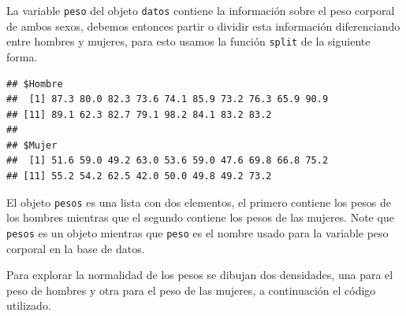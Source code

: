 \documentclass[10pt,]{krantz}
\makeatletter
\newenvironment{Shaded}{\begin{snugshade}}{\end{snugshade}}
\newcommand{\KeywordTok}[1]{\textcolor[rgb]{0.13,0.29,0.53}{\textbf{#1}}}
\newcommand{\DataTypeTok}[1]{\textcolor[rgb]{0.13,0.29,0.53}{#1}}
\newcommand{\DecValTok}[1]{\textcolor[rgb]{0.00,0.00,0.81}{#1}}
\newcommand{\StringTok}[1]{\textcolor[rgb]{0.31,0.60,0.02}{#1}}
\newcommand{\CommentTok}[1]{\textcolor[rgb]{0.56,0.35,0.01}{\textit{#1}}}
\newcommand{\OperatorTok}[1]{\textcolor[rgb]{0.81,0.36,0.00}{\textbf{#1}}}
\newcommand{\NormalTok}[1]{#1}
\newenvironment{kframe}{%
\medskip{}
\setlength{\fboxsep}{.8em}
 \def\at@end@of@kframe{}%
 \ifinner\ifhmode%
  \def\at@end@of@kframe{\end{minipage}}%
  \begin{minipage}{\columnwidth}%
 \fi\fi%
 \def\FrameCommand##1{\hskip\@totalleftmargin \hskip-\fboxsep
 \colorbox{shadecolor}{##1}\hskip-\fboxsep
     \hskip-\linewidth \hskip-\@totalleftmargin \hskip\columnwidth}%
 \MakeFramed {\advance\hsize-\width
   \@totalleftmargin\z@ \linewidth\hsize
   \@setminipage}}%
 {\par\unskip\endMakeFramed%
 \at@end@of@kframe}
\renewenvironment{Shaded}{\begin{kframe}}{\end{kframe}}
\makeatother
\begin{document}
La variable \texttt{peso} del objeto \texttt{datos} contiene la
información sobre el peso corporal de ambos sexos, debemos entonces
partir o dividir esta información diferenciando entre hombres y mujeres,
para esto usamos la función \texttt{split} de la siguiente forma.

\begin{Shaded}
\end{Shaded}

\begin{verbatim}
## $Hombre
##  [1] 87.3 80.0 82.3 73.6 74.1 85.9 73.2 76.3 65.9 90.9
## [11] 89.1 62.3 82.7 79.1 98.2 84.1 83.2 83.2
## 
## $Mujer
##  [1] 51.6 59.0 49.2 63.0 53.6 59.0 47.6 69.8 66.8 75.2
## [11] 55.2 54.2 62.5 42.0 50.0 49.8 49.2 73.2
\end{verbatim}

El objeto \texttt{pesos} es una lista con dos elementos, el primero
contiene los pesos de los hombres mientras que el segundo contiene los
pesos de las mujeres. Note que \texttt{pesos} es un objeto mientras que
\texttt{peso} es el nombre usado para la variable peso corporal en la
base de datos.

Para explorar la normalidad de los pesos se dibujan dos densidades, una
para el peso de hombres y otra para el peso de las mujeres, a
continuación el código utilizado.

\begin{Shaded}
\end{Shaded}
\end{document}

